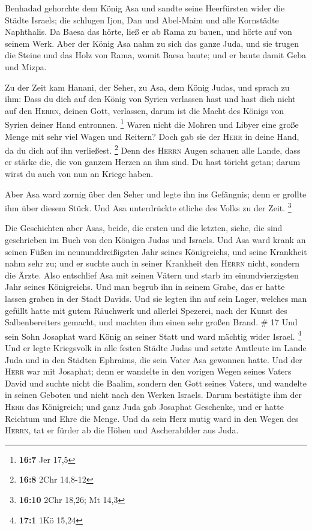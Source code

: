  Benhadad gehorchte dem König Asa und sandte seine
Heerfürsten wider die Städte Israels; die schlugen Ijon, Dan und
Abel-Maim und alle Kornstädte Naphthalis.  Da Baesa das
hörte, ließ er ab Rama zu bauen, und hörte auf von seinem Werk.
 Aber der König Asa nahm zu sich das ganze Juda, und sie
trugen die Steine und das Holz von Rama, womit Baesa baute; und er baute
damit Geba und Mizpa.

 Zu der Zeit kam Hanani, der Seher, zu Asa, dem König
Judas, und sprach zu ihm: Dass du dich auf den König von Syrien
verlassen hast und hast dich nicht auf den \textsc{Herrn}, deinen Gott,
verlassen, darum ist die Macht des Königs von Syrien deiner Hand
entronnen. \footnote{\textbf{16:7} Jer 17,5}  Waren nicht
die Mohren und Libyer eine große Menge mit sehr viel Wagen und Reitern?
Doch gab sie der \textsc{Herr} in deine Hand, da du dich auf ihn
verließest. \footnote{\textbf{16:8} 2Chr 14,8-12}  Denn
des \textsc{Herrn} Augen schauen alle Lande, dass er stärke die, die von
ganzem Herzen an ihm sind. Du hast töricht getan; darum wirst du auch
von nun an Kriege haben.

 Aber Asa ward zornig über den Seher und legte ihn ins
Gefängnis; denn er grollte ihm über diesem Stück. Und Asa unterdrückte
etliche des Volks zu der Zeit. \footnote{\textbf{16:10} 2Chr 18,26; Mt
  14,3}

 Die Geschichten aber Asas, beide, die ersten und die
letzten, siehe, die sind geschrieben im Buch von den Königen Judas und
Israels.  Und Asa ward krank an seinen Füßen im
neununddreißigsten Jahr seines Königreichs, und seine Krankheit nahm
sehr zu; und er suchte auch in seiner Krankheit den \textsc{Herrn}
nicht, sondern die Ärzte.  Also entschlief Asa mit seinen
Vätern und starb im einundvierzigsten Jahr seines Königreichs.
 Und man begrub ihn in seinem Grabe, das er hatte lassen
graben in der Stadt Davids. Und sie legten ihn auf sein Lager, welches
man gefüllt hatte mit gutem Räuchwerk und allerlei Spezerei, nach der
Kunst des Salbenbereiters gemacht, und machten ihm einen sehr großen
Brand. \# 17  Und sein Sohn Josaphat ward König an seiner
Statt und ward mächtig wider Israel. \footnote{\textbf{17:1} 1Kö 15,24}
 Und er legte Kriegsvolk in alle festen Städte Judas und
setzte Amtleute im Lande Juda und in den Städten Ephraims, die sein
Vater Asa gewonnen hatte.  Und der \textsc{Herr} war mit
Josaphat; denn er wandelte in den vorigen Wegen seines Vaters David und
suchte nicht die Baalim,  sondern den Gott seines Vaters,
und wandelte in seinen Geboten und nicht nach den Werken Israels.
 Darum bestätigte ihm der \textsc{Herr} das Königreich;
und ganz Juda gab Josaphat Geschenke, und er hatte Reichtum und Ehre die
Menge.  Und da sein Herz mutig ward in den Wegen des
\textsc{Herrn}, tat er fürder ab die Höhen und Ascherabilder aus Juda.

